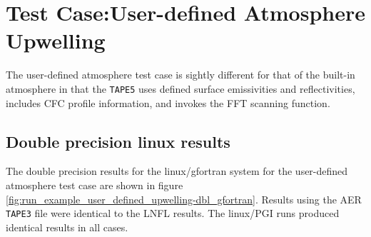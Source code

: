\section{Test Case:User-defined Atmosphere Upwelling}

The user-defined atmosphere test case is sightly different for that of the built-in atmosphere in that the \texttt{TAPE5} uses defined surface emissivities and reflectivities, includes CFC profile information, and invokes the FFT scanning function.

\subsection{Double precision linux results}
The double precision results for the linux/gfortran system for the user-defined atmosphere test case are shown in figure \ref{fig:run_example_user_defined_upwelling-dbl_gfortran}. Results using the AER \texttt{TAPE3} file were identical to the LNFL results. The linux/PGI runs produced identical results in all cases.

